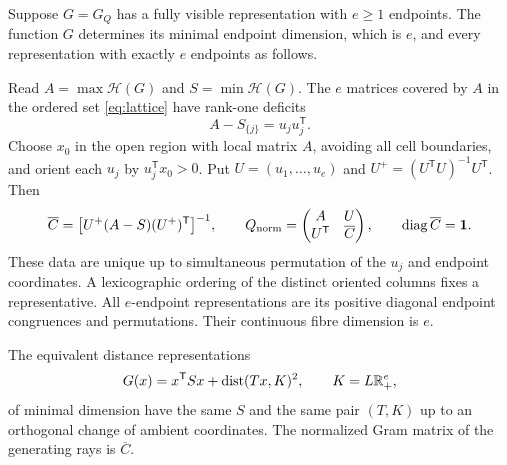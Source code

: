 \begin{theorem}\label{thm:reconstruct}
Suppose $G=G_Q$ has a fully visible representation with $e\ge1$ endpoints. The function $G$ determines its minimal endpoint dimension, which is $e$, and every representation with exactly $e$ endpoints as follows.

Read $A=\max\mathcal H(G)$ and $S=\min\mathcal H(G)$. The $e$ matrices covered by $A$ in the ordered set \eqref{eq:lattice} have rank-one deficits
\[
 A-S_{\{j\}}=u_ju_j^{\mathsf T}.
\]
Choose $x_0$ in the open region with local matrix $A$, avoiding all cell boundaries, and orient each $u_j$ by $u_j^{\mathsf T}x_0>0$. Put $U=(u_1,\ldots,u_e)$ and $U^+=(U^{\mathsf T}U)^{-1}U^{\mathsf T}$. Then
\begin{equation}\label{eq:endpoint-reconstruct}
 \overline C=\bigl[U^+(A-S)(U^+)^{\mathsf T}\bigr]^{-1},\qquad
 Q_{\rm norm}=\begin{pmatrix}A&U\\U^{\mathsf T}&\overline C\end{pmatrix},
 \qquad \operatorname{diag}\overline C=\mathbf1.
\end{equation}
These data are unique up to simultaneous permutation of the $u_j$ and endpoint coordinates. A lexicographic ordering of the distinct oriented columns fixes a representative. All $e$-endpoint representations are its positive diagonal endpoint congruences and permutations. Their continuous fibre dimension is $e$.

The equivalent distance representations
\begin{equation}\label{eq:distance-representation}
 G(x)=x^{\mathsf T}Sx+\operatorname{dist}(Tx,K)^2,
 \qquad K=L\mathbb R_+^e,
\end{equation}
of minimal dimension have the same $S$ and the same pair $(T,K)$ up to an orthogonal change of ambient coordinates. The normalized Gram matrix of the generating rays is $\overline C$.
\end{theorem}
